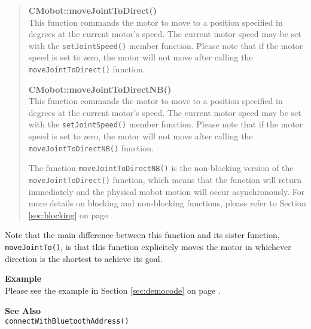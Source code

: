 \begin{quote}
{\bf CMobot::moveJointToDirect()}\\
This function commands the motor to move to a position specified in degrees at
the current motor's speed. The current motor speed may be set with the
\texttt{setJointSpeed()} member function. Please note that if the motor speed
is set to zero, the motor will not move after calling the
\texttt{moveJointToDirect()} function. 

{\bf CMobot::moveJointToDirectNB()}\\
This function commands the motor to move to a position specified in degrees at
the current motor's speed. The current motor speed may be set with the
\texttt{setJointSpeed()} member function. Please note that if the motor speed
is set to zero, the motor will not move after calling the
\texttt{moveJointToDirectNB()} function. 

The function \texttt{moveJointToDirectNB()} is the non-blocking version of
the \texttt{moveJointToDirect()} function, which means that the function will return
immediately and the physical mobot motion will occur asynchronously. For
more details on blocking and non-blocking functions, please refer to 
Section \ref{sec:blocking} on page \pageref{sec:blocking}.\\
\end{quote}

Note that the main difference between this function and its sister function,
\texttt{moveJointTo()}, is that this function explicitely moves the motor in
whichever direction is the shortest to achieve its goal.

\noindent
{\bf Example}\\
Please see the example in Section \ref{sec:democode} on page \pageref{sec:democode}.\\
\noindent

\noindent
{\bf See Also}\\
\texttt{connectWithBluetoothAddress()}

